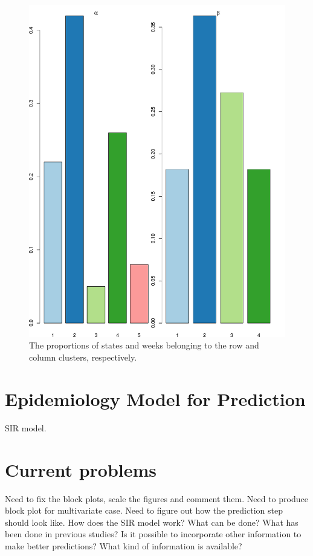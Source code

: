 \documentclass[12pt,a4paper]{article}
\begin{document}
\begin{figure}[H]
	\begin{center}
		\includegraphics[width=\columnwidth]{Multi_prop.pdf}
		\caption{The proportions of states and weeks belonging to the row and column clusters, respectively.}
		
	\end{center}
\end{figure} 

\section{Epidemiology Model for Prediction}
SIR model.

\section{Current problems}
Need to fix the block plots, scale the figures and comment them. Need to produce block plot for multivariate case. Need to figure out how the prediction step should look like. How does the SIR model work? What can be done? What has been done in previous studies? Is it possible to incorporate other information to make better predictions? What kind of information is available?
\printbibliography
\end{document}
